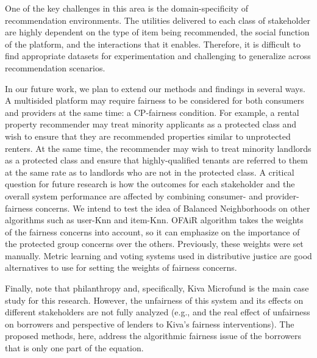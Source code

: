 One of the key challenges in this area is the domain-specificity of recommendation environments. The utilities delivered to each class of stakeholder are highly dependent on the type of item being recommended, the social function of the platform, and the interactions that it enables. Therefore, it is difficult to find appropriate datasets for experimentation and challenging to generalize across recommendation scenarios.

In our future work, we plan to extend our methods and findings in several ways. A multisided platform may require fairness to be considered for both consumers and providers at the same time: a CP-fairness condition. For example, a rental property recommender may treat minority applicants as a protected class and wish to ensure that they are recommended properties similar to unprotected renters. At the same time, the recommender may wish to treat minority landlords as a protected class and ensure that highly-qualified tenants are referred to them at the same rate as to landlords who are not in the protected class. A critical question for future research is how the outcomes for each stakeholder and the overall system performance are affected by combining consumer- and provider-fairness concerns. We intend to test the idea of Balanced Neighborhoods on other algorithms such as user-Knn and item-Knn. OFAiR algorithm takes the weights of the fairness concerns into account, so it can emphasize on the importance of the protected group concerns over the others. Previously, these weights were set manually. Metric learning and voting systems used in distributive justice are good alternatives to use for setting the weights of fairness concerns.

Finally, note that philanthropy and, specifically, Kiva Microfund is the main case study for this research. However, the unfairness of this system and its effects on different stakeholders are not fully analyzed (e.g., and the real effect of unfairness on borrowers and perspective of lenders to Kiva's fairness interventions). The proposed methods, here, address the algorithmic fairness issue of the borrowers that is only one part of the equation.






